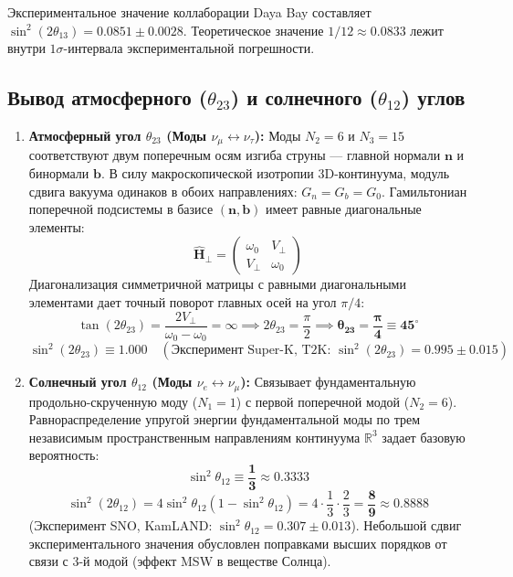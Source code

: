 \documentclass[12pt,a4paper]{article}
\begin{document}
Экспериментальное значение коллаборации Daya Bay составляет $\sin^2(2\theta_{13}) = 0.0851 \pm 0.0028$. Теоретическое значение $1/12 \approx 0.0833$ лежит внутри $1\sigma$-интервала экспериментальной погрешности.

\subsection{Вывод атмосферного ($\theta_{23}$) и солнечного ($\theta_{12}$) углов}
\begin{enumerate}
	\item \textbf{Атмосферный угол $\theta_{23}$ (Моды $\nu_\mu \leftrightarrow \nu_\tau$):}
	Моды $N_2=6$ и $N_3=15$ соответствуют двум поперечным осям изгиба струны — главной нормали $\mathbf{n}$ и бинормали $\mathbf{b}$. В силу макроскопической изотропии 3D-континуума, модуль сдвига вакуума одинаков в обоих направлениях: $G_n = G_b = G_0$. 
	Гамильтониан поперечной подсистемы в базисе $(\mathbf{n}, \mathbf{b})$ имеет равные диагональные элементы:
	\begin{equation}
		\hat{\mathbf{H}}_{\perp} = \begin{pmatrix} \omega_0 & V_{\perp} \\ V_{\perp} & \omega_0 \end{pmatrix}
	\end{equation}
	Диагонализация симметричной матрицы с равными диагональными элементами дает точный поворот главных осей на угол $\pi/4$:
	\begin{equation}
		\tan(2\theta_{23}) = \frac{2 V_{\perp}}{\omega_0 - \omega_0} = \infty \implies 2\theta_{23} = \frac{\pi}{2} \implies \mathbf{\theta_{23} = \frac{\pi}{4} \equiv 45^{\circ}}
	\end{equation}
	\begin{equation}
		\sin^2(2\theta_{23}) \equiv \mathbf{1.000} \quad (\text{Эксперимент Super-K, T2K: } \sin^2(2\theta_{23}) = 0.995 \pm 0.015)
	\end{equation}
	
	\item \textbf{Солнечный угол $\theta_{12}$ (Моды $\nu_e \leftrightarrow \nu_\mu$):}
	Связывает фундаментальную продольно-скрученную моду ($N_1=1$) с первой поперечной модой ($N_2=6$). Равнораспределение упругой энергии фундаментальной моды по трем независимым пространственным направлениям континуума $\mathbb{R}^3$ задает базовую вероятность:
	\begin{equation}
		\sin^2\theta_{12} \equiv \mathbf{\frac{1}{3}} \approx 0.3333
	\end{equation}
	\begin{equation}
		\sin^2(2\theta_{12}) = 4 \sin^2\theta_{12} (1 - \sin^2\theta_{12}) = 4 \cdot \frac{1}{3} \cdot \frac{2}{3} = \mathbf{\frac{8}{9}} \approx \mathbf{0.8888}
	\end{equation}
	(Эксперимент SNO, KamLAND: $\sin^2\theta_{12} = 0.307 \pm 0.013$). Небольшой сдвиг экспериментального значения обусловлен поправками высших порядков от связи с 3-й модой (эффект MSW в веществе Солнца).
\end{enumerate}
\end{document}
